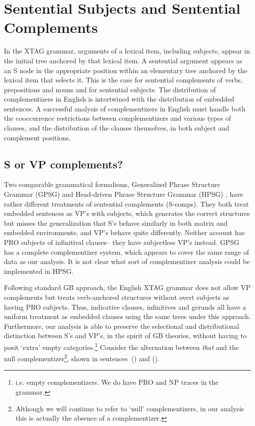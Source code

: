 
\chapter{Sentential Subjects and Sentential Complements}
\label{scomps-section}

In the XTAG grammar, arguments of a lexical item, including
subjects, appear in the initial tree anchored by that lexical item.  A
sentential argument appears as an S node in the appropriate position
within an elementary tree anchored by the lexical item that selects
it. This is the case for sentential complements of verbs, prepositions
and nouns and for sentential subjects. The distribution of
complementizers in English is intertwined with the distribution of
embedded sentences.  A successful analysis of complementizers in
English must handle both the cooccurrence restrictions between
complementizers and various types of clauses, and the distribution of
the clauses themselves, in both subject and complement positions.

\section{S or VP complements?}
 
Two comparable grammatical formalisms, Generalized Phrase Structure
Grammar (GPSG) \cite{gazdar85} and Head-driven Phrase Structure
Grammar (HPSG) \cite{pollard87}, have rather different treatments of
sentential complements (S-comps).  They both treat embedded sentences
as VP's with subjects, which generates the correct structures but
misses the generalization that S's behave similarly in both matrix and
embedded environments, and VP's behave quite differently.  Neither
account has PRO\label{PRO} subjects of infinitival clauses-- they have
subjectless VP's instead.  GPSG has a complete complementizer system,
which appears to cover the same range of data as our analysis.  It is
not clear what sort of complementizer analysis could be implemented in
HPSG.

Following standard GB approach, the English XTAG grammar does not
allow VP complements but treats verb-anchored structures without overt
subjects as having PRO subjects. Thus, indicative clauses, infinitives
and gerunds all have a uniform treatment as embedded clauses using the
same trees under this approach. Furthermore, our analysis is able to
preserve the selectional and distributional distinction between S's and
VP's, in the spirit of GB theories, without having to posit `extra'
empty categories.\footnote{i.e. empty complementizers. We do have PRO
and NP traces in the grammar.} Consider the alternation between {\it
that} and the null complementizer\footnote{Although we will continue
to refer to `null' complementizers, in our analysis this is actually
the absence of a complementizer.}, shown in sentences~() and ().

